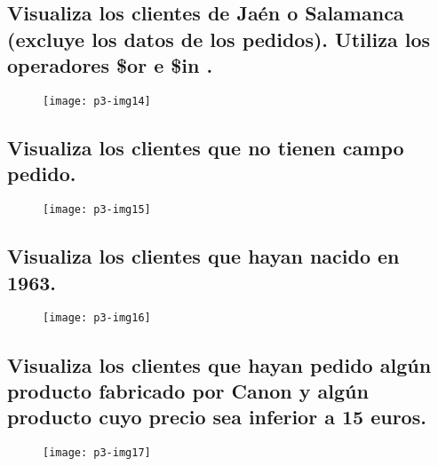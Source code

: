 \documentclass[10pt]{article}
\begin{document}
\subsection{Visualiza los clientes de Jaén o Salamanca (excluye los datos de los pedidos). Utiliza los operadores \$or e \$in .}

 \begin{figure}[H]
	\begin{center}
 		\texttt{[image: p3-img14]}
	\end{center} 
\end{figure}


\subsection{Visualiza los clientes que no tienen campo pedido.}

 \begin{figure}[H]
	\begin{center}
 		\texttt{[image: p3-img15]}
	\end{center} 
\end{figure}


\subsection{Visualiza los clientes que hayan nacido en 1963.}

 \begin{figure}[H]
	\begin{center}
 		\texttt{[image: p3-img16]}
	\end{center} 
\end{figure}

\subsection{Visualiza los clientes que hayan pedido algún producto fabricado por Canon y algún producto cuyo precio sea inferior a 15 euros.}

 \begin{figure}[H]
	\begin{center}
 		\texttt{[image: p3-img17]}
	\end{center} 
\end{figure}
\end{document}

